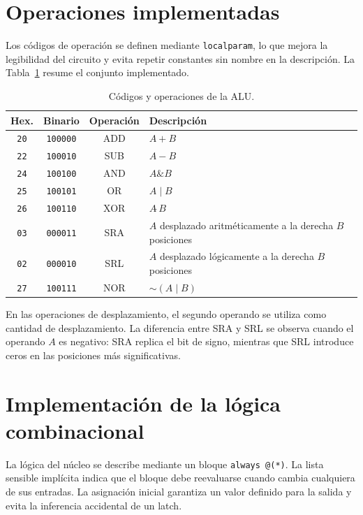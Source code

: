 \documentclass[11pt,a4paper]{article}
\newcommand{\verilog}[1]{\texttt{#1}}
\begin{document}
\section{Operaciones implementadas}

Los códigos de operación se definen mediante \verilog{localparam}, lo que
mejora la legibilidad del circuito y evita repetir constantes sin nombre en la
descripción. La Tabla~\ref{tab:operations} resume el conjunto implementado.

\begin{table}[ht]
\centering
\caption{Códigos y operaciones de la ALU.}
\label{tab:operations}
\renewcommand{\arraystretch}{1.15}
\small
\begin{tabular}{c c c >{\raggedright\arraybackslash}p{6.8cm}}
\toprule
\textbf{Hex.} & \textbf{Binario} & \textbf{Operación} & \textbf{Descripción}\\
\midrule
\texttt{20} & \texttt{100000} & ADD & $A+B$\\
\texttt{22} & \texttt{100010} & SUB & $A-B$\\
\texttt{24} & \texttt{100100} & AND & $A\mathbin{\&}B$\\
\texttt{25} & \texttt{100101} & OR  & $A\mathbin{|}B$\\
\texttt{26} & \texttt{100110} & XOR & $A\mathbin{\hat{~}}B$\\
\texttt{03} & \texttt{000011} & SRA & $A$ desplazado aritméticamente a la derecha $B$ posiciones\\
\texttt{02} & \texttt{000010} & SRL & $A$ desplazado lógicamente a la derecha $B$ posiciones\\
\texttt{27} & \texttt{100111} & NOR & $\mathord{\sim}(A\mathbin{|}B)$\\
\bottomrule
\end{tabular}
\end{table}

En las operaciones de desplazamiento, el segundo operando se utiliza como
cantidad de desplazamiento. La diferencia entre SRA y SRL se observa cuando el
operando $A$ es negativo: SRA replica el bit de signo, mientras que SRL
introduce ceros en las posiciones más significativas.

\section{Implementación de la lógica combinacional}

La lógica del núcleo se describe mediante un bloque \verilog{always @(*)}. La
lista sensible implícita indica que el bloque debe reevaluarse cuando cambia
cualquiera de sus entradas. La asignación inicial garantiza un valor definido
para la salida y evita la inferencia accidental de un latch.
\end{document}
